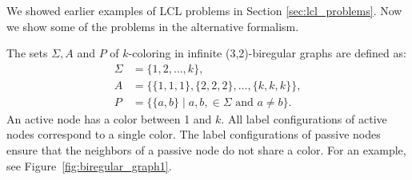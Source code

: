 We showed earlier examples of LCL problems in Section \ref{sec:lcl_problems}.
Now we show some of the problems in the alternative formalism.

The sets $\Sigma, A$ and $P$ of $k$-coloring in infinite (3,2)-biregular graphs are defined as:
\begin{align*}
  \Sigma &= \{1, 2, \dotsc, k\}, \\
  A &= \{\{1,1,1\},\{2,2,2\},\dotsc,\{k,k,k\}\}, \\
  P &= \{\{a, b\}\mid a,b,\in \Sigma \text{ and } a \neq b\}.
\end{align*}
An active node has a color between 1 and $k$.
All label configurations of active nodes correspond to a single color.
The label configurations of passive nodes ensure that the neighbors of a passive node do not share a color.
For an example, see Figure~\ref{fig:biregular_graph1}.

